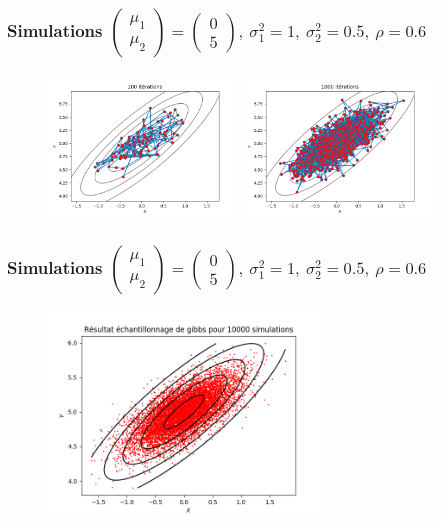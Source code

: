 \begin{frame}
    \frametitle{Simulations \normalsize
    $
    \left(\begin{array}{l}
        {\mu_{1}} \\
        {\mu_{2}}
    \end{array}\right) = 
    \left(\begin{array}{l}
        {0}\\
        {5}
    \end{array}\right)
    , \
    \sigma_1^2 = 1 ,\ \sigma_2^2 = 0.5,\ \rho = 0.6
    $}
    \begin{figure}
        \includegraphics[width=0.45\textwidth]{../MCMC_numeric/simu/simu_100.png} 
        \includegraphics[width=0.45\textwidth]{../MCMC_numeric/simu/simu_1000.png} 
       \end{figure}
\end{frame}

\begin{frame}
    \frametitle{Simulations \normalsize
    $
    \left(\begin{array}{l}
        {\mu_{1}} \\
        {\mu_{2}}
    \end{array}\right) = 
    \left(\begin{array}{l}
        {0}\\
        {5}
    \end{array}\right)
    , \
    \sigma_1^2 = 1 ,\ \sigma_2^2 = 0.5,\ \rho = 0.6
    $}
    \vspace{-0.2cm}
    \begin{figure}
        \includegraphics[width=0.65\textwidth]{../MCMC_numeric/simu/simu.png} 
       \end{figure}
\end{frame}
